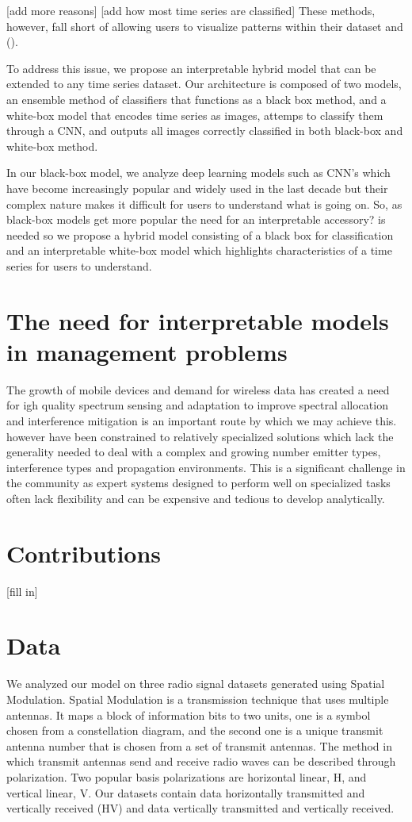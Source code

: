 \documentclass{turabian-thesis}
\begin{document}
[add more reasons]
[add how most time series are classified]
These methods, however, fall short of allowing users to visualize patterns within their dataset and ().

To address this issue, we propose an interpretable hybrid  model that can be extended to any time series dataset. Our architecture is composed of two models, an ensemble method of classifiers that functions as a black box method, and a white-box model that encodes time series as images, attemps to classify them through a CNN, and outputs all images correctly classified in both black-box and white-box method.

In our black-box model, we analyze  deep learning models such as CNN’s which have become increasingly popular and widely used in the last decade but their complex nature makes it difficult for users to understand what is going on. So, as black-box models get more popular the need for an interpretable accessory? is needed so we propose a hybrid model consisting of a black box for classification and an interpretable white-box model which highlights characteristics of a time series for users to understand.

\section{The need for interpretable models in management problems}
The growth of mobile devices and demand for wireless data has created a need for igh quality spectrum sensing and adaptation to improve spectral allocation and interference mitigation is an important route by which we may achieve this.  however have been constrained to relatively specialized solutions which lack the generality needed to deal with a complex and growing number emitter types, interference types and propagation environments.
This is a significant challenge in the community as expert systems designed to perform well on specialized tasks often lack flexibility and can be expensive and tedious to develop analytically.

\section{Contributions}
[fill in]

\section{Data}

We analyzed our model on three radio signal datasets generated using Spatial Modulation. Spatial Modulation is a transmission technique that uses multiple antennas. It maps a block of information bits to two units, one is a symbol chosen from a constellation diagram, and the second one is a unique transmit antenna number that is chosen from a set of transmit antennas. The method in which transmit antennas send and receive radio waves can be described through polarization. Two popular basis polarizations are horizontal linear, H, and vertical linear, V. Our datasets contain data horizontally transmitted and vertically received (HV) and data vertically transmitted and vertically received.
\end{document}
